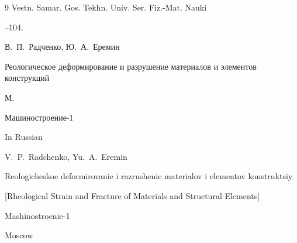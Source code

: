 \begin{thebibliography}{9}
\jour Vestn. Samar. Gos. Tekhn. Univ. Ser. Fiz.-Mat. Nauki



--104.










\by В.~П.~Радченко, Ю.~А.~Еремин 

\book Реологическое деформирование и разрушение материалов и элементов конструкций 

\publaddr М. 

\publ Машиностроение-1 



\misctransl

\lang In Russian

\by V.~P.~Radchenko, Yu.~A.~Eremin

\by Reologicheskoe deformirovanie i razrushenie materialov i elementov konstruktsiy

\rm [Rheological Strain and Fracture of Materials and Structural Elements]

\publ Mashinostroenie-1

\publaddr Moscow









\end{thebibliography}












\makeentitle







 \newpage

%


%

%

